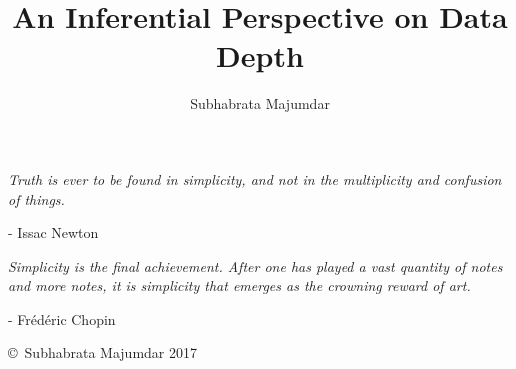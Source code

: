 \documentclass{umnStatThesis}
\author{Subhabrata Majumdar}
\title{An Inferential Perspective on Data Depth}
\begin{document}
\newtheorem{Theorem}{Theorem}[section]
\newtheorem{Lemma}[Theorem]{Lemma}
\newtheorem{Corollary}[Theorem]{Corollary}
\newtheorem{Proposition}[Theorem]{Proposition}
\newtheorem{Conjecture}[Theorem]{Conjecture}
\theoremstyle{definition} \newtheorem{Definition}[Theorem]{Definition}
\theoremstyle{definition} \newtheorem{Example}[Theorem]{Example}

\maketitlepage %

\begin{prepage}

\begin{minipage}{.7\textwidth}
\vspace{2em}
\begin{flushleft}
{\it
Truth is ever to be found in simplicity, and not in the multiplicity and confusion of things.}
\end{flushleft}

\begin{flushright}
- Issac Newton \hspace{3em}
\end{flushright}

\begin{flushleft}
{\it
Simplicity is the final achievement. After one has played a vast quantity of notes and more notes, it is simplicity that emerges as the crowning reward of art.}
\end{flushleft}

\begin{flushright}
- Fr\'ed\'eric Chopin
\end{flushright}
\end{minipage}


\vspace*{\fill}
\copyright\ Subhabrata Majumdar 2017
\end{prepage}

\frontmatter

\begin{acknowledgementspage} %

\end{acknowledgementspage}

\begin{dedicationpage} %

\end{dedicationpage}
\end{document}
